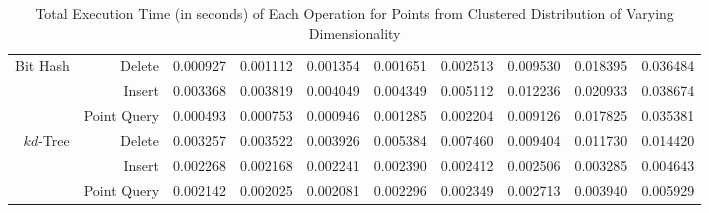 \begin{landscape}
\begin{table}
{\begin{tabular}{|r|r|l|l|l|l|l|l|l|l|}
	\hline
	\multirow{3}{*}{Bit Hash} & Delete & 0.000927 & 0.001112 & 0.001354 & 0.001651 & 0.002513 & 0.009530 & 0.018395 & 0.036484 \\
	& Insert & 0.003368 & 0.003819 & 0.004049 & 0.004349 & 0.005112 & 0.012236 & 0.020933 & 0.038674 \\ 
	& Point Query & 0.000493 & 0.000753 & 0.000946 & 0.001285 & 0.002204 & 0.009126 & 0.017825 & 0.035381 \\ 
	\hline
	\multirow{3}{*}{$kd$-Tree} & Delete & 0.003257 & 0.003522 & 0.003926 & 0.005384 & 0.007460 & 0.009404 & 0.011730 & 0.014420 \\
	& Insert & 0.002268 & 0.002168 & 0.002241 & 0.002390 & 0.002412 & 0.002506 & 0.003285 & 0.004643 \\ 
	& Point Query & 0.002142 & 0.002025 & 0.002081 & 0.002296 & 0.002349 & 0.002713 & 0.003940 & 0.005929 \\ 
	\hline
			\end{tabular}
		}%

		\caption{Total Execution Time (in seconds) of Each Operation for Points from Clustered Distribution of Varying Dimensionality}
		\label{perf-synthetic-clustered-times}
	\end{table}


\end{landscape}
